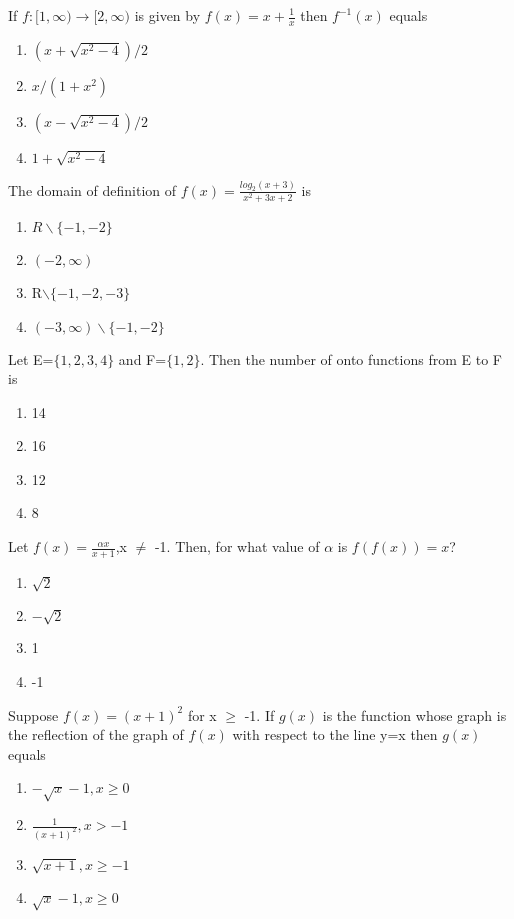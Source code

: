 \item If $f:[1,\infty) \rightarrow [2,\infty)$ is given by $f(x) = x+\frac{1}{x}$ then $f^{-1}(x)$ equals
\begin{enumerate}
\item $(x+\sqrt{x^2-4})/2$
\item $x/(1+x^2)$
\item $(x-\sqrt{x^2-4})/2$
\item $1+\sqrt{x^2-4}$
\end{enumerate}

\item The domain of definition of $f(x)=\frac{log_2(x+3)}{x^2+3x+2}$ is
\begin{enumerate}
\item $R\backslash\{-1,-2 \}$
\item $(-2,\infty)$
\item R$\backslash\{-1,-2,-3 \}$
\item $(-3,\infty)\backslash\{-1,-2 \}$
\end{enumerate} 

\item Let E=$\{1,2,3,4 \}$ and F=$\{1,2 \}$. Then the number of onto functions from E to F is
\begin{enumerate}
\item 14
\item 16
\item 12
\item 8
\end{enumerate}

\item Let $f(x)=\frac{\alpha x}{x+1}$,x $\neq$ -1. Then, for what value of $\alpha$ is $f(f(x))=x$?
\begin{enumerate}
\item $\sqrt{2}$
\item $-\sqrt{2}$
\item 1
\item -1
\end{enumerate} 

\item Suppose $f(x)=(x+1)^2$ for x $\geq$ -1. If $g(x)$ is the function whose graph is the reflection of the  graph of $f(x)$ with respect to the line y=x then $g(x)$ equals
\begin{enumerate}
\item $-\sqrt{x}-1, x \geq 0$
\item $\frac{1}{(x+1)^{2}}, x > -1$
\item $\sqrt{x+1}, x\geq-1$
\item $\sqrt{x}-1, x\geq0$
\end{enumerate}

